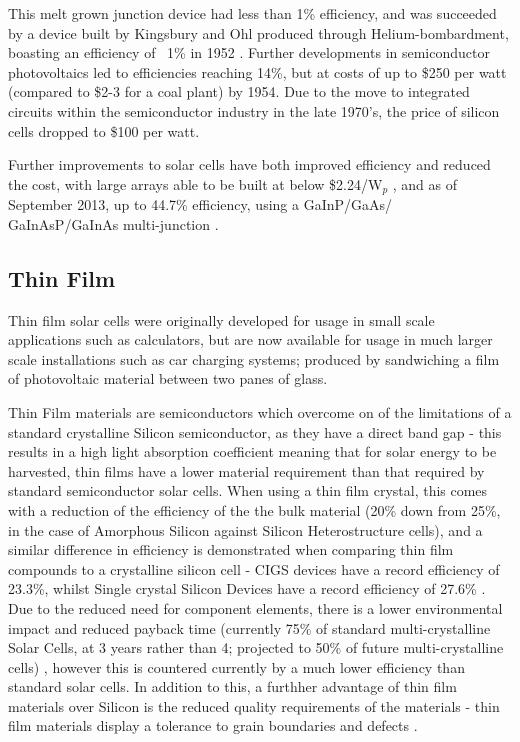 This melt grown junction device had less than 1\% efficiency, and was succeeded by a device built by Kingsbury and Ohl produced through Helium-bombardment, boasting an efficiency of ~1\% in 1952 \citep{Green2009a}. Further developments in semiconductor photovoltaics led to efficiencies reaching 14\%, but at costs of up to \$250 per watt (compared to \$2-3 for a coal plant) by 1954. Due to the move to integrated circuits within the semiconductor industry in the late 1970's, the price of silicon cells dropped to \$100 per watt.

Further improvements to  solar cells have both improved efficiency and reduced the cost, with large arrays able to be built at below \$2.24/W$_p$ \citep{EricWesoff}, and as of September 2013, up to 44.7\% efficiency, using a GaInP/GaAs/\\GaInAsP/GaInAs multi-junction \citep{ISI:000331334400001}.


\subsection{Thin Film}

Thin film solar cells were originally developed for usage in small scale applications such as calculators, but are now available for usage in much larger scale installations such as car charging systems; produced by sandwiching a film of photovoltaic material between two panes of glass. 

Thin Film materials are semiconductors which overcome on of the limitations of a standard crystalline Silicon semiconductor, as they have a direct band gap - this results in a high light absorption coefficient meaning that for solar energy to be harvested, thin films have a lower material requirement than that required by standard semiconductor solar cells. When using a thin film crystal, this comes with a reduction of the efficiency of the the bulk material (20\% down from 25\%, in the case of Amorphous Silicon against Silicon Heterostructure cells), and a similar difference in efficiency is demonstrated when comparing thin film compounds to a crystalline silicon cell - CIGS devices have a record efficiency of 23.3\%, whilst Single crystal Silicon Devices have a record efficiency of 27.6\% \citep{Photovoltaics2014}. Due to the reduced need for component elements, there is a lower environmental impact and reduced payback time (currently 75\% of standard multi-crystalline Solar Cells, at 3 years rather than 4; projected to 50\% of future multi-crystalline cells) \citep{Photovoltaics}, however this is countered currently by a much lower efficiency than standard solar cells. In addition to this, a furthher advantage of thin film materials over Silicon is the reduced quality requirements of the materials - thin film materials display a tolerance to grain boundaries and defects \citep{Siebentritt2006}. 

